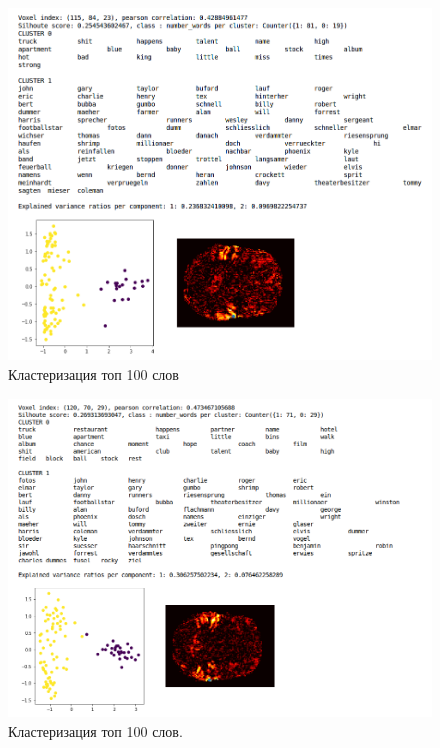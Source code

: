 \documentclass[pdftex,ptm,12pt,a4paper]{report}
\theoremstyle{definition}
\begin{document}
\begin{figure}
\centering
\includegraphics[scale=0.55]{images/sub9_names.png}
\caption{Кластеризация топ 100 слов}
\label{sub9_names}
\end{figure}

\begin{figure}[h]
\centering
\includegraphics[scale=0.55]{images/sub15_names.png}
\caption{Кластеризация топ 100 слов.}
\label{sub15_names}
\end{figure}
\end{document}
